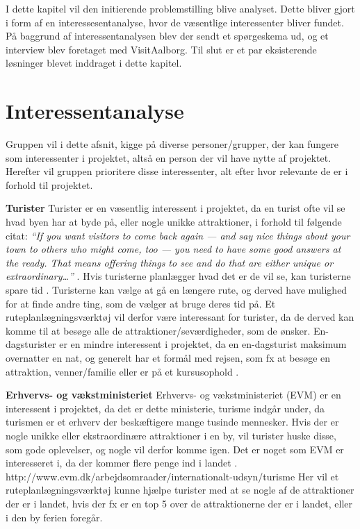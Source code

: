 I dette kapitel vil den initierende problemstilling blive analyset. Dette bliver gjort i form af en interessesentanalyse, hvor de væsentlige interessenter bliver fundet. På baggrund af interessentanalysen blev der sendt et spørgeskema ud, og et interview blev foretaget med VisitAalborg. Til slut er et par eksisterende løsninger blevet inddraget i dette kapitel. 

\section{Interessentanalyse}
Gruppen vil i dette afsnit, kigge på diverse personer/grupper, der kan fungere som interessenter i projektet, altså en person der vil have nytte af projektet. Herefter vil gruppen prioritere disse interessenter, alt efter hvor relevante de er i forhold til projektet.

\textbf{Turister}\newline
Turister er en væsentlig interessent i projektet, da en turist ofte vil se hvad byen har at byde på, eller nogle unikke attraktioner, i forhold til følgende citat: \newline 
\textit{“If you want visitors to come back again — and say nice things about your town to others who might come, too — you need to have some good answers at the ready. That means offering things to see and do that are either unique or extraordinary…”} \citep{UniversityOfMinnesota}.\newline 
Hvis turisterne planlægger hvad det er de vil se, kan turisterne spare tid \citep{YouthCentral}. Turisterne kan vælge at gå en længere rute, og derved have mulighed for at finde andre ting, som de vælger at bruge deres tid på. Et ruteplanlægningsværktøj vil derfor være interessant for turister, da de derved kan komme til at besøge alle de attraktioner/seværdigheder, som de ønsker.
En-dagsturister er en mindre interessent i projektet, da en en-dagsturist maksimum overnatter en nat, og generelt har et formål med rejsen, som fx at besøge en attraktion, venner/familie eller er på et kursusophold \citep{Faxe}.

\textbf{Erhvervs- og vækstministeriet}\newline
Erhvervs- og vækstministeriet (EVM) er en interessent i projektet, da det er dette ministerie, turisme indgår under, da turismen er et erhverv der beskæftigere mange tusinde mennesker. Hvis der er nogle unikke eller ekstraordinære attraktioner i en by, vil turister huske disse, som gode oplevelser, og nogle vil derfor komme igen. Det er noget som EVM er interesseret i, da der kommer flere penge ind i landet \citep{VisitAalborg}.
http://www.evm.dk/arbejdsomraader/internationalt-udsyn/turisme
Her vil et ruteplanlægningsværktøj kunne hjælpe turister med at se nogle af de attraktioner der er i landet, hvis der fx er en top 5 over de attraktionerne der er i landet, eller i den by ferien foregår.

